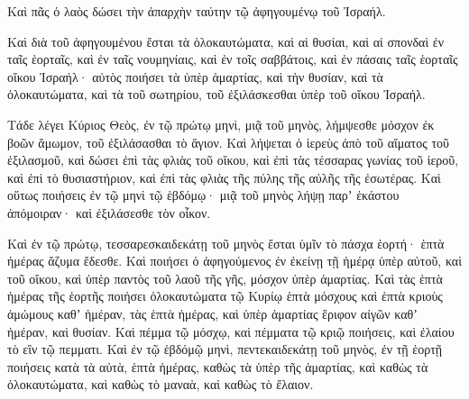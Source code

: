 {Καὶ πᾶς ὁ λαὸς δώσει τὴν ἀπαρχὴν ταύτην τῷ ἀφηγουμένῳ τοῦ Ἰσραήλ.
\par }{\PP {}Καὶ διὰ τοῦ ἀφηγουμένου ἔσται τὰ ὁλοκαυτώματα, καὶ αἱ θυσίαι, καὶ αἱ σπονδαὶ ἐν ταῖς ἑορταῖς, καὶ ἐν ταῖς νουμηνίαις, καὶ ἐν τοῖς σαββάτοις, καὶ ἐν πάσαις ταῖς ἑορταῖς οἴκου Ἰσραήλ· αὐτὸς ποιήσει τὰ ὑπὲρ ἁμαρτίας, καὶ τὴν θυσίαν, καὶ τὰ ὁλοκαυτώματα, καὶ τὰ τοῦ σωτηρίου, τοῦ ἐξιλάσκεσθαι ὑπὲρ τοῦ οἴκου Ἰσραήλ.
\par }{\PP {}Τάδε λέγει Κύριος Θεὸς, ἐν τῷ πρώτῳ μηνὶ, μιᾷ τοῦ μηνὸς, λήμψεσθε μόσχον ἐκ βοῶν ἄμωμον, τοῦ ἐξιλάσασθαι τὸ ἅγιον.
Καὶ λήψεται ὁ ἱερεὺς ἀπὸ τοῦ αἵματος τοῦ ἐξιλασμοῦ, καὶ δώσει ἐπὶ τὰς φλιὰς τοῦ οἴκου, καὶ ἐπὶ τὰς τέσσαρας γωνίας τοῦ ἱεροῦ, καὶ ἐπὶ τὸ θυσιαστήριον, καὶ ἐπὶ τὰς φλιὰς τῆς πύλης τῆς αὐλῆς τῆς ἐσωτέρας.
Καὶ οὕτως ποιήσεις ἐν τῷ μηνὶ τῷ ἑβδόμῳ· μιᾷ τοῦ μηνὸς λήψῃ παρʼ ἑκάστου ἀπόμοιραν· καὶ ἐξιλάσεσθε τὸν οἶκον.
\par }{\PP {}Καὶ ἐν τῷ πρώτῳ, τεσσαρεσκαιδεκάτῃ τοῦ μηνὸς ἔσται ὑμῖν τὸ πάσχα ἑορτή· ἑπτὰ ἡμέρας ἄζυμα ἔδεσθε.
Καὶ ποιήσει ὁ ἀφηγούμενος ἐν ἐκείνῃ τῇ ἡμέρᾳ ὑπὲρ αὐτοῦ, καὶ τοῦ οἴκου, καὶ ὑπὲρ παντὸς τοῦ λαοῦ τῆς γῆς, μόσχον ὑπὲρ ἁμαρτίας.
Καὶ τὰς ἑπτὰ ἡμέρας τῆς ἑορτῆς ποιήσει ὁλοκαυτώματα τῷ Κυρίῳ ἑπτὰ μόσχους καὶ ἑπτὰ κριοὺς ἀμώμους καθʼ ἡμέραν, τὰς ἑπτὰ ἡμέρας, καὶ ὑπὲρ ἁμαρτίας ἔριφον αἰγῶν καθʼ ἡμέραν, καὶ θυσίαν.
Καὶ πέμμα τῷ μόσχῳ, καὶ πέμματα τῷ κριῷ ποιήσεις, καὶ ἐλαίου τὸ εἲν τῷ πεμματι.
Καὶ ἐν τῷ ἑβδόμῷ μηνὶ, πεντεκαιδεκάτῃ τοῦ μηνὸς, ἐν τῇ ἑορτῇ ποιήσεις κατὰ τὰ αὐτὰ, ἑπτὰ ἡμέρας, καθὼς τὰ ὑπὲρ τῆς ἁμαρτίας, καὶ καθὼς τὰ ὁλοκαυτώματα, καὶ καθὼς τὸ μαναὰ, καὶ καθὼς τὸ ἔλαιον.

}
